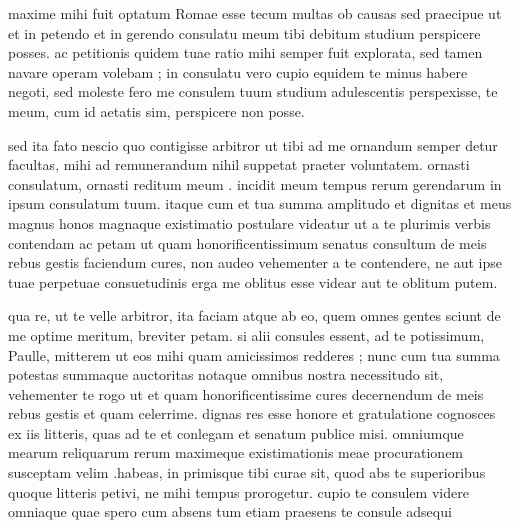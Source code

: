 


 maxime mihi fuit optatum Romae esse tecum multas ob causas sed praecipue ut et in petendo et in gerendo consulatu meum tibi debitum studium perspicere posses. ac petitionis quidem tuae ratio mihi semper fuit explorata, sed tamen navare operam volebam ; in consulatu vero cupio equidem te minus habere negoti, sed moleste fero me consulem tuum studium adulescentis perspexisse, te meum, cum id aetatis sim, perspicere non posse.

 sed ita fato nescio quo contigisse arbitror ut tibi ad me ornandum semper detur facultas, mihi ad remunerandum nihil suppetat praeter voluntatem. ornasti consulatum, ornasti reditum meum . incidit meum tempus rerum gerendarum in ipsum consulatum tuum. itaque cum et tua summa amplitudo et dignitas et meus magnus honos magnaque existimatio postulare videatur ut a te plurimis verbis contendam ac petam ut quam honorificentissimum senatus consultum de meis rebus gestis faciendum cures, non audeo vehementer a te contendere, ne aut ipse tuae perpetuae consuetudinis erga me oblitus esse videar aut te oblitum putem.

 qua re, ut te velle arbitror, ita faciam atque ab eo, quem omnes gentes sciunt de me optime meritum, breviter petam. si alii consules essent, ad te potissimum, Paulle, mitterem ut eos mihi quam amicissimos redderes ; nunc cum tua summa potestas summaque auctoritas notaque omnibus nostra necessitudo sit, vehementer te rogo ut et quam honorificentissime cures decernendum de meis rebus gestis et quam celerrime. dignas res esse honore et gratulatione cognosces ex iis litteris, quas ad te et conlegam et senatum publice misi. omniumque mearum reliquarum rerum maximeque existimationis meae procurationem susceptam velim .habeas, in primisque tibi curae sit, quod abs te superioribus quoque litteris petivi, ne mihi tempus prorogetur. cupio te consulem videre omniaque quae spero cum absens tum etiam praesens te consule adsequi
